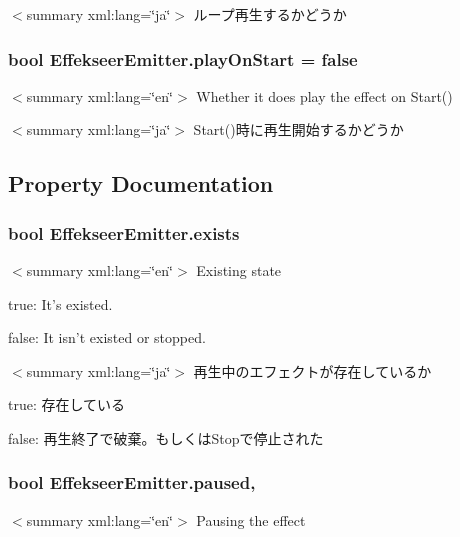 $<$summary xml\-:lang=\char`\"{}ja\char`\"{}$>$ ループ再生するかどうか \hypertarget{class_effekseer_emitter_a8ff5bc48852b4a21e3b33b0cd0e8b65a}{
\subsubsection[{play\-On\-Start}]{\setlength{\rightskip}{0pt plus 5cm}bool Effekseer\-Emitter.\-play\-On\-Start = false}}\label{class_effekseer_emitter_a8ff5bc48852b4a21e3b33b0cd0e8b65a}
$<$summary xml\-:lang=\char`\"{}en\char`\"{}$>$ Whether it does play the effect on Start() 

$<$summary xml\-:lang=\char`\"{}ja\char`\"{}$>$ Start()時に再生開始するかどうか 

\subsection{Property Documentation}
\hypertarget{class_effekseer_emitter_aa4b49f6d532b7e75f2d207866ecee574}{
\subsubsection[{exists}]{\setlength{\rightskip}{0pt plus 5cm}bool Effekseer\-Emitter.\-exists\hspace{0.3cm}{\ttfamily [get]}}}\label{class_effekseer_emitter_aa4b49f6d532b7e75f2d207866ecee574}
$<$summary xml\-:lang=\char`\"{}en\char`\"{}$>$ Existing state 

true\-: It's existed.

false\-: It isn't existed or stopped.

$<$summary xml\-:lang=\char`\"{}ja\char`\"{}$>$ 再生中のエフェクトが存在しているか 

true\-: 存在している

false\-: 再生終了で破棄。もしくは\-Stopで停止された\hypertarget{class_effekseer_emitter_a5979b4e756a1f31e439752de6fb86c64}{
\subsubsection[{paused}]{\setlength{\rightskip}{0pt plus 5cm}bool Effekseer\-Emitter.\-paused\hspace{0.3cm}{\ttfamily [get]}, {\ttfamily [set]}}}\label{class_effekseer_emitter_a5979b4e756a1f31e439752de6fb86c64}
$<$summary xml\-:lang=\char`\"{}en\char`\"{}$>$ Pausing the effect 

